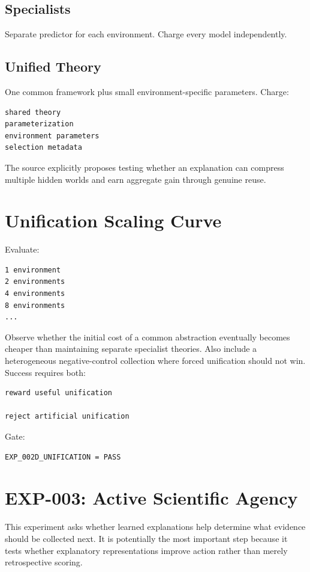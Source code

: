 \documentclass[11pt]{article}
\begin{document}
\subsection*{Specialists}

Separate predictor for each environment. Charge every model independently.

\subsection*{Unified Theory}

One common framework plus small environment-specific parameters. Charge:
\begin{verbatim}
shared theory
parameterization
environment parameters
selection metadata
\end{verbatim}
The source explicitly proposes testing whether an explanation can compress multiple hidden worlds and earn aggregate gain through genuine reuse.

\section{Unification Scaling Curve}

Evaluate:
\begin{verbatim}
1 environment
2 environments
4 environments
8 environments
...
\end{verbatim}
Observe whether the initial cost of a common abstraction eventually becomes cheaper than maintaining separate specialist theories. Also include a heterogeneous negative-control collection where forced unification should not win. Success requires both:
\begin{verbatim}
reward useful unification

reject artificial unification
\end{verbatim}
Gate:
\begin{verbatim}
EXP_002D_UNIFICATION = PASS
\end{verbatim}

\section{EXP-003: Active Scientific Agency}

This experiment asks whether learned explanations help determine what evidence should be collected next. It is potentially the most important step because it tests whether explanatory representations improve action rather than merely retrospective scoring.
\end{document}
